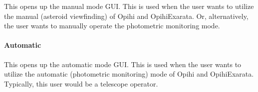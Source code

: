 \documentclass[letterpaper,11pt,english]{sphinxmanual}
\begin{document}
\begin{savenotes}\begin{fulllineitems}
\label{\detokenize{user/command_line:cmdoption-arg-manual}}\label{\detokenize{user/command_line:cmdoption-arg-m}}
\pysigstartsignatures
{}
\pysigstopsignatures
\end{fulllineitems}\end{savenotes}


\sphinxAtStartPar
This opens up the manual mode GUI. This is used when the user wants to
utilize the manual (asteroid view\sphinxhyphen{}finding) of Opihi and OpihiExarata. Or,
alternatively, the user wants to manually operate the photometric monitoring
mode.


\paragraph{Automatic}
\label{\detokenize{user/command_line:automatic}}\label{\detokenize{user/command_line:user-command-line-available-actions-automatic}}

\begin{savenotes}\begin{fulllineitems}
\label{\detokenize{user/command_line:cmdoption-arg-automatic}}\label{\detokenize{user/command_line:cmdoption-arg-auto}}\label{\detokenize{user/command_line:cmdoption-arg-a}}
\pysigstartsignatures
{}
\pysigstopsignatures
\end{fulllineitems}\end{savenotes}


\sphinxAtStartPar
This opens up the automatic mode GUI. This is used when the user wants to
utilize the automatic (photometric monitoring) mode of Opihi and OpihiExarata.
Typically, this user would be a telescope operator.
\end{document}
